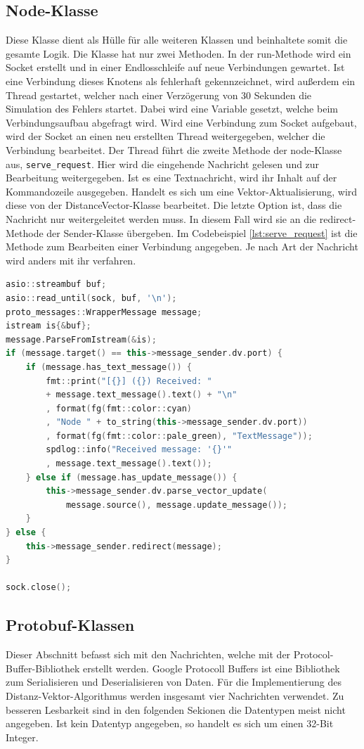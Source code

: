 \subsection{Node-Klasse}
Diese Klasse dient als Hülle für alle weiteren Klassen und beinhaltete somit die gesamte Logik. Die Klasse hat nur zwei Methoden. In der run-Methode wird ein Socket erstellt und in einer Endlosschleife auf neue Verbindungen gewartet. Ist eine Verbindung dieses Knotens als fehlerhaft gekennzeichnet, wird außerdem ein Thread gestartet, welcher nach einer Verzögerung von 30 Sekunden die Simulation des Fehlers startet. Dabei wird eine Variable gesetzt, welche beim Verbindungsaufbau abgefragt wird. Wird eine Verbindung zum Socket aufgebaut, wird der Socket an einen neu erstellten Thread weitergegeben, welcher die Verbindung bearbeitet. Der Thread führt die zweite Methode der node-Klasse aus, \verb|serve_request|. Hier wird die eingehende Nachricht gelesen und zur Bearbeitung weitergegeben. Ist es eine Textnachricht, wird ihr Inhalt auf der Kommandozeile ausgegeben. Handelt es sich um eine Vektor-Aktualisierung, wird diese von der DistanceVector-Klasse bearbeitet. Die letzte Option ist, dass die Nachricht nur weitergeleitet werden muss. In diesem Fall wird sie an die redirect-Methode der Sender-Klasse übergeben. Im Codebeispiel \ref{lst:serve_request} ist die Methode zum Bearbeiten einer Verbindung angegeben. Je nach Art der Nachricht wird anders mit ihr verfahren.

\begin{lstlisting}[language={C++}, caption={Bearbeiten einer Verbindung}, label={lst:serve_request}]
asio::streambuf buf;
asio::read_until(sock, buf, '\n');
proto_messages::WrapperMessage message;
istream is{&buf};
message.ParseFromIstream(&is);
if (message.target() == this->message_sender.dv.port) {
    if (message.has_text_message()) {
        fmt::print("[{}] ({}) Received: " 
        + message.text_message().text() + "\n"
        , format(fg(fmt::color::cyan)
        , "Node " + to_string(this->message_sender.dv.port))
        , format(fg(fmt::color::pale_green), "TextMessage"));
        spdlog::info("Received message: '{}'"
        , message.text_message().text());
    } else if (message.has_update_message()) {
        this->message_sender.dv.parse_vector_update(
            message.source(), message.update_message());
    }
} else {
    this->message_sender.redirect(message);
}

sock.close();
\end{lstlisting}

\subsection{Protobuf-Klassen}
Dieser Abschnitt befasst sich mit den Nachrichten, welche mit der Protocol-Buffer-Bibliothek erstellt werden. Google Protocoll Buffers ist eine Bibliothek zum Serialisieren und Deserialisieren von Daten. Für die Implementierung des Distanz-Vektor-Algorithmus werden insgesamt vier Nachrichten verwendet. Zu besseren Lesbarkeit sind in den folgenden Sekionen die Datentypen meist nicht angegeben. Ist kein Datentyp angegeben, so handelt es sich um einen 32-Bit Integer.
